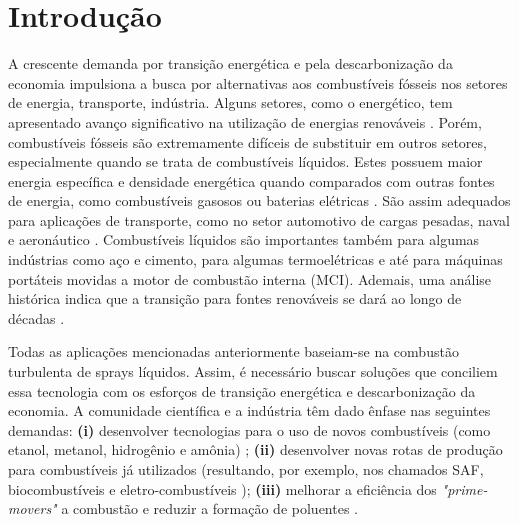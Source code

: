 \section{Introdução} \label{sec:intro}

A crescente demanda por transição energética e pela descarbonização da economia impulsiona a busca por alternativas aos combustíveis fósseis nos setores de energia, transporte, indústria. 
Alguns setores, como o energético, tem apresentado avanço significativo na utilização de energias renováveis \cite{MasriA2021}. 
Porém, combustíveis fósseis são extremamente difíceis de substituir em outros setores, especialmente quando se trata de combustíveis líquidos.
Estes possuem maior energia específica e densidade energética quando comparados com outras fontes de energia, como combustíveis gasosos ou baterias elétricas \cite{Bergthorson2017,Julien2017}.
São assim adequados para aplicações de transporte, como no setor automotivo de cargas pesadas, naval e aeronáutico \cite{MasriA2021}.
Combustíveis líquidos são importantes também para algumas indústrias como aço e cimento, para algumas termoelétricas e até para máquinas portáteis movidas a motor de combustão interna (MCI).
Ademais, uma análise histórica indica que a transição para fontes renováveis se dará ao longo de décadas \cite{MasriA2021}.

Todas as aplicações mencionadas anteriormente baseiam-se na combustão turbulenta de sprays líquidos.
Assim, é necessário buscar soluções que conciliem essa tecnologia com os esforços de transição energética e descarbonização da economia.
A comunidade científica e a indústria têm dado ênfase nas seguintes demandas: \textbf{(i)} desenvolver tecnologias para o uso de novos combustíveis (como  etanol, metanol, hidrogênio e amônia) \cite{MasriA2021,FAPESP_etanol_1,VerhelstS2019,TeohY2023,ElbazA2022}; \textbf{(ii)} desenvolver novas rotas de produção para combustíveis já utilizados (resultando, por exemplo, nos chamados SAF, biocombustíveis e eletro-combustíveis \cite{MasriA2021,BenJames-SAF,BergthorsonJ2015,WestbrookC2019,PalysM2022}); \textbf{(iii)} melhorar a eficiência dos \emph{"prime-movers"} a combustão e reduzir a formação de poluentes \cite{MasriA2021}.

